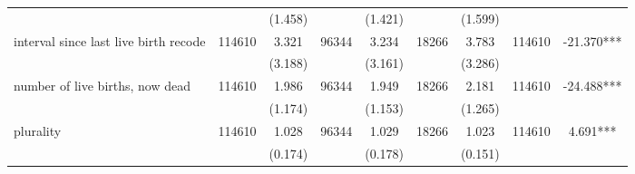 \begin{tabular}{@{\extracolsep{5pt}}lcccccccc}
 &   & (1.458)  &   & (1.421)  &   & (1.599)  &   &  \\ [1ex]                                                                                                                                                                                                                                                                                                  
interval since last live birth recode   & 114610    & 3.321    & 96344    & 3.234    & 18266    & 3.783    & 114610    & -21.370***   \\                                                                                                                                                                                                                       
 &   & (3.188)  &   & (3.161)  &   & (3.286)  &   &  \\ [1ex]                                                                                                                                                                                                                                                                                                  
number of live births, now dead   & 114610    & 1.986    & 96344    & 1.949    & 18266    & 2.181    & 114610    & -24.488***   \\                                                                                                                                                                                                                             
 &   & (1.174)  &   & (1.153)  &   & (1.265)  &   &  \\ [1ex]                                                                                                                                                                                                                                                                                                  
plurality   & 114610    & 1.028    & 96344    & 1.029    & 18266    & 1.023    & 114610    & 4.691***   \\                                                                                                                                                                                                                                                     
 &   & (0.174)  &   & (0.178)  &   & (0.151)  &   &  \\ [1ex]                                                                                                                                                                                                                                                                                                  

\end{tabular}
